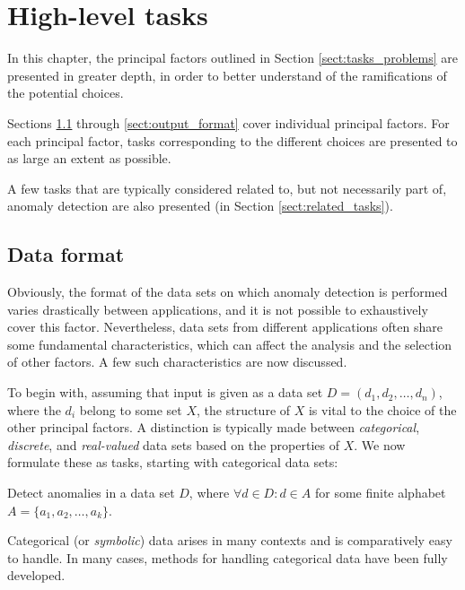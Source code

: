 \chapter{High-level tasks}
\label{ch:tasks}

In this chapter, the principal factors outlined in Section \ref{sect:tasks_problems} are presented in greater depth, in order to better understand of the ramifications of the potential choices.

Sections \ref{sect:data_format} through \ref{sect:output_format} cover individual principal factors. For each principal factor, tasks corresponding to the different choices are presented to as large an extent as possible.

A few tasks that are typically considered related to, but not necessarily part of, anomaly detection are also presented (in Section \ref{sect:related_tasks}).

\section{Data format}
\label{sect:data_format}

Obviously, the format of the data sets on which anomaly detection is performed varies drastically between applications, and it is not possible to exhaustively cover this factor. Nevertheless, data sets from different applications often share some fundamental characteristics, which can affect the analysis and the selection of other factors. A few such characteristics are now discussed.

To begin with, assuming that input is given as a data set $D = (d_1, d_2, \dots, d_n)$, where the $d_i$ belong to some set $X$, the structure of $X$ is vital to the choice of the other principal factors. A distinction is typically made between \emph{categorical}, \emph{discrete}, and \emph{real-valued} data sets based on the properties of $X$. We now formulate these as tasks, starting with categorical data sets:

\begin{task}
  Detect anomalies in a data set $D$, where $\forall d \in D: d \in A$ for some finite alphabet $A = \{a_1, a_2, \dots, a_k\}$.
\end{task}

Categorical (or \emph{symbolic}) data arises in many contexts and is comparatively easy to handle. In many cases, methods for handling categorical data have been fully developed.

